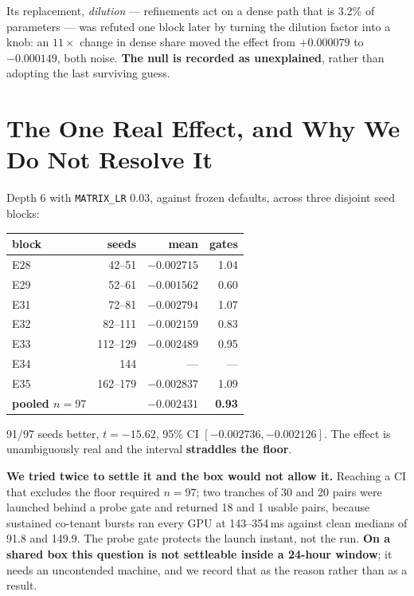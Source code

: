 \documentclass{article}
\begin{document}
Its replacement, \emph{dilution} --- refinements act on a dense path that is 3.2\% of parameters --- was refuted one block later by turning the dilution factor into a knob: an $11\times$ change in dense share moved the effect from $+0.000079$ to $-0.000149$, both noise. \textbf{The null is recorded as unexplained}, rather than adopting the last surviving guess.

\section{The One Real Effect, and Why We Do Not Resolve It}
Depth 6 with \texttt{MATRIX\_LR} 0.03, against frozen defaults, across three disjoint seed blocks:

\begin{center}\begin{small}
\begin{tabular}{lrrr}
\toprule
block & seeds & mean & gates \\
\midrule
E28 & 42--51 & $-0.002715$ & 1.04 \\
E29 & 52--61 & $-0.001562$ & 0.60 \\
E31 & 72--81 & $-0.002794$ & 1.07 \\
E32 & 82--111 & $-0.002159$ & 0.83 \\
E33 & 112--129 & $-0.002489$ & 0.95 \\
E34 & 144 & --- & --- \\
E35 & 162--179 & $-0.002837$ & 1.09 \\
\midrule
\textbf{pooled $n{=}97$} & & $\mathbf{-0.002431}$ & \textbf{0.93} \\
\bottomrule
\end{tabular}
\end{small}\end{center}

91/97 seeds better, $t=-15.62$, 95\% CI $[-0.002736, -0.002126]$. The effect is unambiguously real and the interval \textbf{straddles the floor}.

\textbf{We tried twice to settle it and the box would not allow it.} Reaching a CI that excludes the floor required $n{=}97$; two tranches of 30 and 20 pairs were launched behind a probe gate and returned 18 and 1 usable pairs, because sustained co-tenant bursts ran every GPU at 143--354\,ms against clean medians of 91.8 and 149.9. The probe gate protects the launch instant, not the run. \textbf{On a shared box this question is not settleable inside a 24-hour window}; it needs an uncontended machine, and we record that as the reason rather than as a result.
\end{document}

